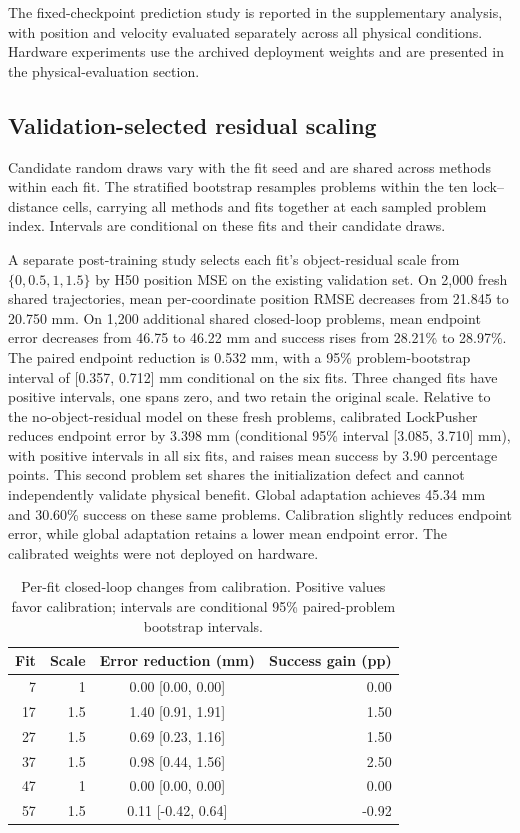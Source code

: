 \documentclass[conference]{IEEEtran}
\begin{document}
The fixed-checkpoint prediction study is reported in the supplementary analysis, with position and velocity evaluated separately across all physical conditions. Hardware experiments use the archived deployment weights and are presented in the physical-evaluation section.

\subsection{Validation-selected residual scaling}
Candidate random draws vary with the fit seed and are shared across methods within each fit. The stratified bootstrap resamples problems within the ten lock--distance cells, carrying all methods and fits together at each sampled problem index. Intervals are conditional on these fits and their candidate draws.

A separate post-training study selects each fit's object-residual scale from $\{0,0.5,1,1.5\}$ by H50 position MSE on the existing validation set. On 2,000 fresh shared trajectories, mean per-coordinate position RMSE decreases from 21.845 to 20.750 mm. On 1,200 additional shared closed-loop problems, mean endpoint error decreases from 46.75 to 46.22 mm and success rises from 28.21\% to 28.97\%. The paired endpoint reduction is 0.532 mm, with a 95\% problem-bootstrap interval of [0.357, 0.712] mm conditional on the six fits. Three changed fits have positive intervals, one spans zero, and two retain the original scale. Relative to the no-object-residual model on these fresh problems, calibrated LockPusher reduces endpoint error by 3.398 mm (conditional 95\% interval [3.085, 3.710] mm), with positive intervals in all six fits, and raises mean success by 3.90 percentage points. This second problem set shares the initialization defect and cannot independently validate physical benefit. Global adaptation achieves 45.34 mm and 30.60\% success on these same problems. Calibration slightly reduces endpoint error, while global adaptation retains a lower mean endpoint error. The calibrated weights were not deployed on hardware.

\begin{table}[t]\centering\small
\caption{Per-fit closed-loop changes from calibration. Positive values favor calibration; intervals are conditional 95\% paired-problem bootstrap intervals.}\label{tab:calibration-fits}
\begin{tabular}{rrcr}\toprule
Fit & Scale & Error reduction (mm) & Success gain (pp)\\\midrule
7 & 1 & 0.00 [0.00, 0.00] & 0.00\\
17 & 1.5 & 1.40 [0.91, 1.91] & 1.50\\
27 & 1.5 & 0.69 [0.23, 1.16] & 1.50\\
37 & 1.5 & 0.98 [0.44, 1.56] & 2.50\\
47 & 1 & 0.00 [0.00, 0.00] & 0.00\\
57 & 1.5 & 0.11 [-0.42, 0.64] & -0.92\\
\bottomrule\end{tabular}\end{table}
\end{document}
